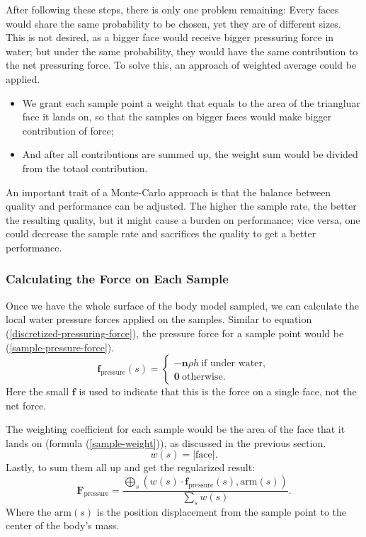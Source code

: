 After following these steps, there is only one problem remaining:
Every faces would share the same probability to be chosen, yet they are of different sizes.
This is not desired, as a bigger face would receive bigger pressuring force in water;
but under the same probability, they would have the same contribution to the net pressuring force.
To solve this, an approach of weighted average could be applied.
\begin{itemize}
	\item We grant each sample point a weight that equals to the area of the triangluar face it lands on, so that the samples on bigger faces would make bigger contribution of force;
	\item And after all contributions are summed up, the weight sum would be divided from the totaol contribution.
\end{itemize}

An important trait of a Monte-Carlo approach is that the balance between quality and performance can be adjusted.
The higher the sample rate, the better the resulting quality, but it might cause a burden on performance;
vice versa, one could decrease the sample rate and sacrifices the quality to get a better performance.

\subsubsection{Calculating the Force on Each Sample}

Once we have the whole surface of the body model sampled, we can calculate the local water pressure forces applied on the samples.
Similar to equation (\ref{discretized-pressuring-force}), the pressure force for a sample point would be (\ref{sample-pressure-force}).
\begin{equation}
	\mathbf{f}_{\text{pressure}}(s)=
	\begin{cases}
		-\mathbf{n}\rho h \ \text{if under water}, \\
		\mathbf{0} \ \text{otherwise}.
	\end{cases}
	\label{sample-pressure-force}
\end{equation}
Here the small $\mathbf{f}$ is used to indicate that this is the force on a single face, not the net force.

The weighting coefficient for each sample would be the area of the face that it lands on (formula (\ref{sample-weight})), as discussed in the previous section.
\begin{equation}
	w(s)=|\text{face}|.
	\label{sample-weight}
\end{equation}
Lastly, to sum them all up and get the regularized result:
\begin{equation}
	\mathbf{F}_{\text{pressure}}=\frac
		{
			\bigoplus_{s}
			\left(
				w(s)\cdot\mathbf{f}_{\text{pressure}}(s)
				,
				\text{arm}(s)
			\right)
		}
		{\sum_{s}w(s)}.
	\label{net-pressure-force}
\end{equation}
Where the $\text{arm}(s)$ is the position displacement from the sample point to the center of the body's mass.

